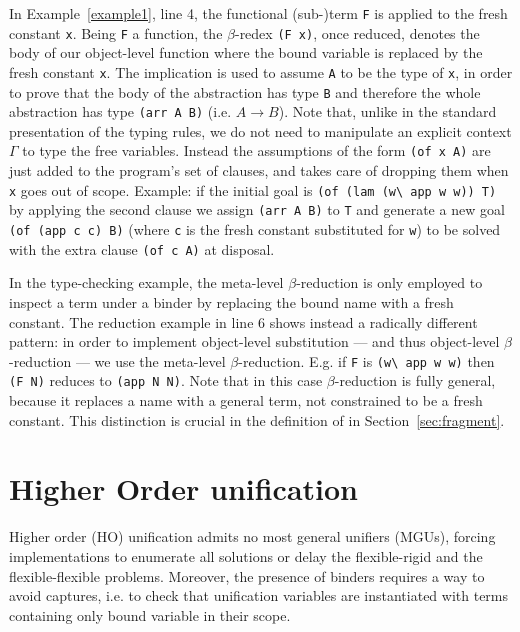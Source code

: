 \documentclass{llncs}
\begin{document}
In Example~\ref{example1}, line 4, the functional (sub-)term
\verb+F+ is applied to the fresh constant \verb+x+. Being \verb+F+ a
function, the $\beta$-redex \verb+(F x)+, once reduced, denotes the body of
our object-level function where the bound variable is replaced by the fresh
constant \verb+x+.
The implication is used to
assume \verb+A+ to be the type of \verb+x+, in order to prove that the body of
the abstraction has type \verb+B+ and therefore the whole abstraction has type
\verb+(arr A B)+ (i.e. $A \to B$). Note that, unlike in
the standard presentation of the typing rules, we do not need to manipulate an
explicit context $\Gamma$ to type the free variables. Instead the assumptions
of the form \verb+(of x A)+ are just added to the program's set of clauses, and \lp{}
takes care of dropping them when \verb+x+ goes out of scope.
Example: if the initial goal is
\verb+(of (lam (w\ app w w)) T)+ by applying the second clause we assign
\verb+(arr A B)+ to \verb+T+ and generate
a new goal \verb+(of (app c c) B)+ (where \verb+c+ is the fresh constant
substituted for \verb+w+) to be solved with the extra clause \verb+(of c A)+
at disposal.

In the type-checking example, the meta-level $\beta$-reduction is only employed
to inspect a term under a binder by replacing the bound name with a fresh
constant. The reduction example in line 6
shows instead a radically different pattern: in order to implement object-level
substitution --- and thus object-level $\beta$-reduction --- we use the
meta-level $\beta$-reduction. E.g. if \verb+F+ is \verb+(w\ app w w)+
then \verb+(F N)+ reduces to \verb+(app N N)+. Note that in this case
$\beta$-reduction is fully general, because it replaces a name with a
general term, not constrained to be a fresh constant.
This distinction is crucial in the definition of \rff{} in
Section~\ref{sec:fragment}.

\section{Higher Order unification}%
\label{sec:ho}
Higher order (HO) unification admits no most general unifiers (MGUs), forcing
implementations to enumerate all solutions or delay the flexible-rigid
and the flexible-flexible problems. Moreover, the presence of binders
requires a way to avoid captures, i.e. to check that unification variables
are instantiated with terms containing only bound variable in their scope.
\end{document}
